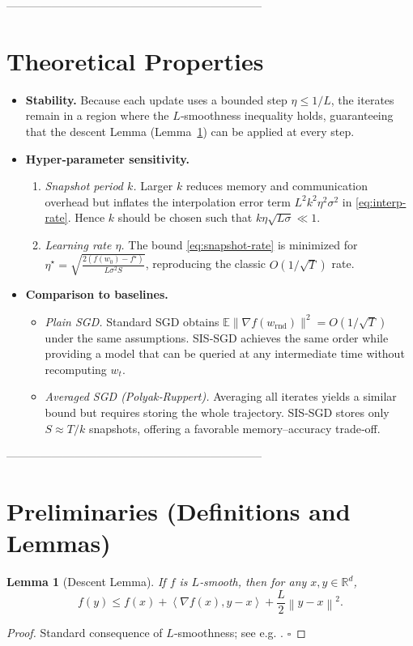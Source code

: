 \documentclass{article}
\newtheorem{lemma}{Lemma}
\newcommand{\EE}{\mathbb{E}}
\newcommand{\RR}{\mathbb{R}}
\newcommand{\norm}[1]{\left\|#1\right\|}
\newcommand{\inner}[2]{\left\langle #1,#2\right\rangle}
\begin{document}
--------------------------------------------------------------------

\section*{Theoretical Properties}
\begin{itemize}
    \item \textbf{Stability.} Because each update uses a bounded step $\eta\le1/L$, the iterates remain in a region where the $L$‑smoothness inequality holds, guaranteeing that the descent Lemma (Lemma~\ref{lem:descent}) can be applied at every step.
    \item \textbf{Hyper‑parameter sensitivity.}
          \begin{enumerate}[label=(\alph*)]
              \item \emph{Snapshot period $k$.} Larger $k$ reduces memory and communication overhead but inflates the interpolation error term $L^2k^2\eta^2\sigma^2$ in \eqref{eq:interp-rate}. Hence $k$ should be chosen such that $k\eta\sqrt{L\sigma}\ll1$.
              \item \emph{Learning rate $\eta$.} The bound \eqref{eq:snapshot-rate} is minimized for $\eta^{\star}= \sqrt{\frac{2(f(w_0)-f^{\star})}{L\sigma^2 S}}$, reproducing the classic $O(1/\sqrt{T})$ rate.
          \end{enumerate}
    \item \textbf{Comparison to baselines.}
          \begin{itemize}
              \item \emph{Plain SGD.} Standard SGD obtains $\EE\|\nabla f(w_{\text{rnd}})\|^2=O(1/\sqrt{T})$ under the same assumptions. SIS‑SGD achieves the same order while providing a model that can be queried at any intermediate time without recomputing $w_t$.
              \item \emph{Averaged SGD (Polyak‑Ruppert).} Averaging all iterates yields a similar bound but requires storing the whole trajectory. SIS‑SGD stores only $S\approx T/k$ snapshots, offering a favorable memory–accuracy trade‑off.
          \end{itemize}
\end{itemize}

--------------------------------------------------------------------

\section*{Preliminaries (Definitions and Lemmas)}
\begin{lemma}[Descent Lemma]\label{lem:descent}
If $f$ is $L$‑smooth, then for any $x,y\in\RR^{d}$,
\[
f(y)\le f(x)+\inner{\nabla f(x)}{y-x}+\frac{L}{2}\norm{y-x}^2 .
\]
\end{lemma}
\begin{proof}
Standard consequence of $L$‑smoothness; see e.g. \cite{nocedal2006numerical}. \hfill $\square$
\end{proof}
\end{document}

